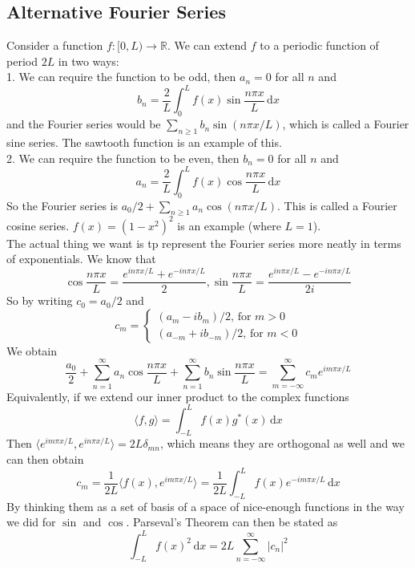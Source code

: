 \subsection{Alternative Fourier Series}
Consider a function $f:[0,L)\to\mathbb R$.
We can extend $f$ to a periodic function of period $2L$ in two ways:\\
1. We can require the function to be odd, then $a_n=0$ for all $n$ and
$$b_n=\frac{2}{L}\int_0^Lf(x)\sin\frac{n\pi x}{L}\,\mathrm dx$$
and the Fourier series would be $\sum_{n\ge 1}b_n\sin(n\pi x/L)$, which is called a Fourier sine series.
The sawtooth function is an example of this.\\
2. We can require the function to be even, then $b_n=0$ for all $n$ and
$$a_n=\frac{2}{L}\int_0^Lf(x)\cos\frac{n\pi x}{L}\,\mathrm dx$$
So the Fourier series is $a_0/2+\sum_{n\ge 1}a_n\cos(n\pi x/L)$.
This is called a Fourier cosine series.
$f(x)=(1-x^2)^2$ is an example (where $L=1$).\\
The actual thing we want is tp represent the Fourier series more neatly in terms of exponentials.
We know that
$$\cos\frac{n\pi x}{L}=\frac{e^{in\pi x/L}+e^{-in\pi x/L}}{2},\sin\frac{n\pi x}{L}=\frac{e^{in\pi x/L}-e^{-in\pi x/L}}{2i}$$
So by writing $c_0=a_0/2$ and
$$c_m=\begin{cases}
    (a_m-ib_m)/2\text{, for $m>0$}\\
    (a_{-m}+ib_{-m})/2\text{, for $m<0$}
\end{cases}$$
We obtain
$$\frac{a_0}{2}+\sum_{n=1}^\infty a_n\cos\frac{n\pi x}{L}+\sum_{n=1}^\infty b_n\sin\frac{n\pi x}{L}=\sum_{m=-\infty}^\infty c_me^{im\pi x/L}$$
Equivalently, if we extend our inner product to the complex functions
$$\langle f,g\rangle=\int_{-L}^Lf(x)g^*(x)\,\mathrm dx$$
Then $\langle e^{im\pi x/L},e^{in\pi x/L}\rangle=2L\delta_{mn}$, which means they are orthogonal as well and we can then obtain
$$c_m=\frac{1}{2L}\langle f(x),e^{im\pi x/L}\rangle=\frac{1}{2L}\int_{-L}^Lf(x)e^{-im\pi x/L}\,\mathrm dx$$
By thinking them as a set of basis of a space of nice-enough functions in the way we did for $\sin$ and $\cos$.
Parseval's Theorem can then be stated as
$$\int_{-L}^Lf(x)^2\,\mathrm dx=2L\sum_{n=-\infty}^\infty|c_n|^2$$
